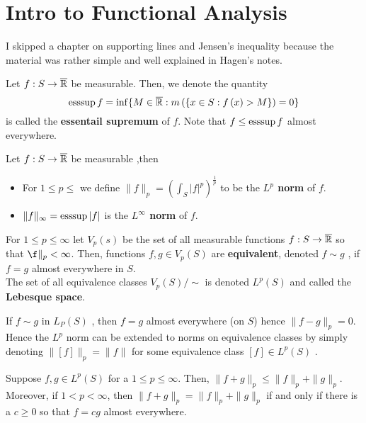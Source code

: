 \section{Intro to Functional Analysis}
I skipped a chapter on supporting lines and Jensen's inequality because the material was rather simple and well explained in Hagen's notes.\\
\begin{definition}
	Let \(f: S \to \overline{\mathbb{R}}\) be measurable. Then, we denote the quantity \[
		\operatorname{esssup} f = \inf \{ M \in \overline{\mathbb{R}} : m \left( \{x \in S : f\left( x \right) > M\}  \right) = 0   \}
\] is called the \textbf{essentail supremum }of \(f\). Note that \(f \le \operatorname{esssup} f\) almost everywhere.
\end{definition}
\begin{definition}[Lp space]
	Let \(f: S \to \overline{\mathbb{R}}\) be measurable ,then
	\begin{itemize}
		\item For \( 1 \le p \le \) we define \(\|f\|_{p} = \left( \int_{S} \left| f \right| ^{p} \right)^{\frac{1}{p}} \) to be the \textbf{\(L^{p}\) norm } of \(f\).
			\item \(\|f\|_{\infty} = \operatorname{esssup} \left| f \right| \) is the \textbf{\(L^{\infty}\) norm} of \(f\).
	\end{itemize}
\end{definition}
\begin{definition}
	For \(1 \le p \le \infty\) let \(V_{p}\left( s \right) \) be the set of all measurable functions \(f: S \to \overline{\mathbb{R}}\) so that \(\f\|_{p}< \infty\). Then, functions \(f, g \in V_{p}\left( S \right) \) are \textbf{equivalent}, denoted \(f \sim g\) , if \(f = g\) almost everywhere in \(S\).\\
	The set of all equivalence classes \(V_{p}\left( S \right) / \sim\) is denoted \(L^{p}\left( S \right) \) and called the \textbf{Lebesque space}.
\end{definition}
\begin{remark}
	If \(f \sim g\) in \(L_{P}\left( S \right) \) , then \(f = g\) almost everywhere (on \(S\)) hence \(\|f - g\|_{p}= 0\). Hence the \(L^{p}\) norm can be extended to norms on equivalence classes by simply denoting \(\|\left[ f \right] \|_{p} = \|f\|\) for some equivalence class \(\left[ f \right]  \in L^{p}\left( S \right) \) .
\end{remark}
\begin{theorem}
	Suppose \(f, g \in L^{p}\left( S \right) \) for a \(1 \le p \le \infty\). Then, \(\|f + g\|_{p} \le \|f\|_{p} + \|g\|_{p}\).\\
	Moreover, if \(1 < p < \infty\), then \(\|f + g\|_{p} = \|f\|_{p} + \|g\|_{p}\) if and only if there is a \(c \ge 0\) so that \(f = c g\) almost everywhere.
\end{theorem}
